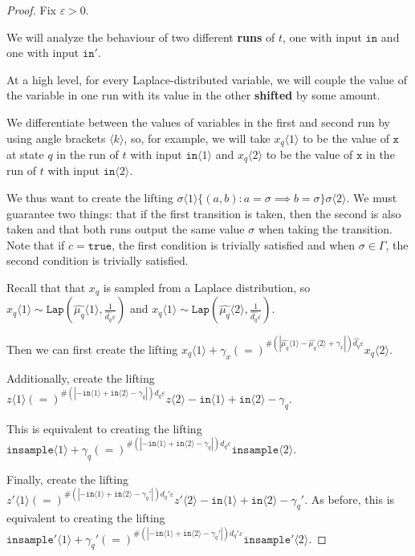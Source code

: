 \documentclass[12pt]{article}
\newcommand{\brangle}[1]{\langle #1 \rangle}
\newcommand{\Lap}{\texttt{Lap}}
\theoremstyle{definition}
\begin{document}
\begin{proof}
Fix $\varepsilon>0$.

We will analyze the behaviour of two different \textbf{runs} of $t$, one with input $\texttt{in}$ and one with input $\texttt{in}'$. 

At a high level, for every Laplace-distributed variable, we will couple the value of the variable in one run with its value in the other \textbf{shifted} by some amount. 

We differentiate between the values of variables in the first and second run by using angle brackets $\brangle{k}$, so, for example, we will take $x_q\brangle{1}$ to be the value of $\texttt{x}$ at state $q$ in the run of $t$ with input $\texttt{in}\brangle{1}$ and $x_q\brangle{2}$ to be the value of $\texttt{x}$ in the run of $t$ with input $\texttt{in}\brangle{2}$. 

We thus want to create the lifting $\sigma\brangle{1}\{(a, b): a=\sigma\implies b=\sigma\}\sigma\brangle{2}$. We must guarantee two things: that if the first transition is taken, then the second is also taken and that both runs output the same value $\sigma$ when taking the transition. Note that if $c = \texttt{true}$, the first condition is trivially satisfied and when $\sigma\in \Gamma$, the second condition is trivially satisfied. 



Recall that that $x_q$ is sampled from a Laplace distribution, so $x_q\brangle{1}\sim \Lap(\hat{\mu_q}\brangle{1}, \frac{1}{\hat{d_q}\varepsilon})$ and $x_q\brangle{1}\sim \Lap(\hat{\mu_q}\brangle{2}, \frac{1}{\hat{d_q}\varepsilon})$.

Then we can first create the lifting $x_q\brangle{1}+\gamma_x (=)^{\#(|\hat{\mu_q}\brangle{1}-\hat{\mu_q}\brangle{2}+\gamma_x|)\hat{d_q}\varepsilon}x_q\brangle{2}$.

Additionally, create the lifting $z\brangle{1} (=)^{\#(|-\texttt{in}\brangle{1}+\texttt{in}\brangle{2}-\gamma_q|)d_q\varepsilon}z\brangle{2} - \texttt{in}\brangle{1}+\texttt{in}\brangle{2}-\gamma_q$. 

This is equivalent to creating the lifting $\texttt{insample}\brangle{1} +\gamma_q{(=)}^{\#(|-\texttt{in}\brangle{1}+\texttt{in}\brangle{2}-\gamma_q|)d_q\varepsilon}\texttt{insample}\brangle{2}$.

Finally, create the lifting $z'\brangle{1} (=)^{\#(|-\texttt{in}\brangle{1}+\texttt{in}\brangle{2}-\gamma_q'|)d_q'\varepsilon}z'\brangle{2} - \texttt{in}\brangle{1}+\texttt{in}\brangle{2}-\gamma_q'$. As before, this is equivalent to creating the lifting $\texttt{insample}'\brangle{1} +\gamma_q'{(=)}^{\#(|-\texttt{in}\brangle{1}+\texttt{in}\brangle{2}-\gamma_q'|)d_q'\varepsilon}\texttt{insample}'\brangle{2}$.


\end{proof}
\end{document}
